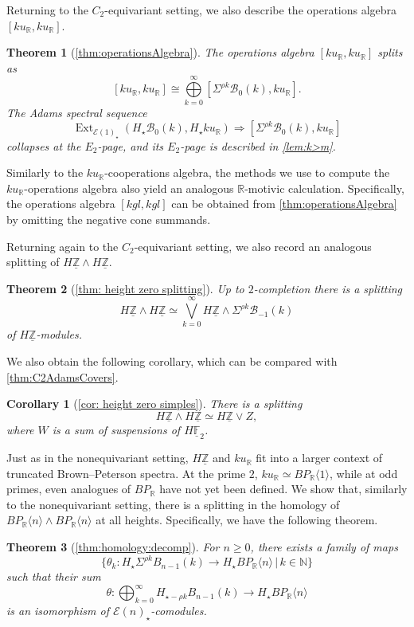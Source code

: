 \documentclass{amsart}
\newtheorem*{thm*}{Theorem}
\newtheorem*{cor*}{Corollary}
\theoremstyle{plain}
\numberwithin{equation}{section}
\numberwithin{figure}{section}
\DeclareMathOperator{\Ext}{Ext}
\newcommand{\mF}{{\mathbb F}}
\newcommand{\mN}{{\mathbb N}}
\newcommand{\mR}{{\mathbb R}}
\newcommand{\mZ}{{\mathbb Z}}
\newcommand{\cB}{{\mathcal B}}
\newcommand{\cE}{{\mathcal E}}
\newcommand{\umF}{\underline{\mF}}
\newcommand{\umZ}{\underline{\mZ}}
\newcommand{\0}{\langle 0 \rangle }
\begin{document}
Returning to the $C_2$-equivariant setting, we also describe the operations algebra $[ku_\mR, ku_\mR]$. 
\begin{thm*}[\cref{thm:operationsAlgebra}]
     The operations algebra $[ku_\mR, ku_\mR]$ splits as
     \[ [ku_\mR, ku_\mR] \cong \bigoplus\limits_{k=0}^{\infty}[\Sigma^{\rho k}\cB_{0}(k), ku_\mR] .\]
     The Adams spectral sequence \[\Ext_{\cE(1)_{\star}}(H_{\star}\cB_{0}(k), H_{\star}ku_\mR) \Longrightarrow [\Sigma^{\rho k}\cB_{0}(k), ku_\mR]\] collapses at the $E_{2}$-page, and its $E_{2}$-page is described in \cref{lem:k>m}.
\end{thm*}

Similarly to the $ku_\mR$-cooperations algebra, the methods we use to compute the $ku_\mR$-\newline operations algebra also yield an analogous $\mR$-motivic calculation. Specifically, the operations algebra $[kgl, kgl]$ can be obtained from \cref{thm:operationsAlgebra} by omitting the negative cone summands. 

Returning again to the $C_2$-equivariant setting, we also record an analogous splitting of $H\umZ \wedge H\umZ$. 
\begin{thm*}[\cref{thm: height zero splitting}]
     Up to $2$-completion there is a splitting
\[ H \umZ \wedge H \umZ \simeq \bigvee\limits_{k=0}^{\infty} H \umZ \wedge \Sigma^{\rho k}\cB_{-1}(k) \]
of $H \umZ$-modules.
\end{thm*}
We also obtain the following corollary, which can be compared with \cref{thm:C2AdamsCovers}.
\begin{cor*}[\cref{cor: height zero simples}] There is a splitting
    \[  H \umZ \wedge H \umZ \simeq H \umZ \vee Z,\]
where $W$ is a sum of suspensions of $H\umF_{2}$.
\end{cor*}

Just as in the nonequivariant setting, $H\umZ$ and $ku_{\mR}$ fit into a larger context of truncated Brown--Peterson spectra.
At the prime $2$, $ku_\mR \simeq BP_\mR \langle 1 \rangle$, while at odd primes, even analogues of $BP_\mathbb{R}$ have not yet been defined. We show that, similarly to the nonequivariant setting, there is a splitting in the homology of $BP_\mR \langle n \rangle \wedge BP_\mR \langle n \rangle$ at all heights. Specifically, we have the following theorem.
\begin{thm*}[\cref{thm:homology:decomp}]
For $n \geq 0$, there exists a family of maps
$$\{\theta_k: H_\star\Sigma^{\rho k} B_{n - 1}(k) \to H_\star BP_\mR \langle n \rangle \, | \, k \in \mN \} $$
such that their sum
$$  \theta : \bigoplus_{k = 0}^\infty  H_{\star - \rho k} B_{n - 1}(k) \to H_\star BP_\mR \langle n \rangle $$
is an isomorphism of $\mathcal{E}(n)_\star$-comodules. 
\end{thm*}
\end{document}
